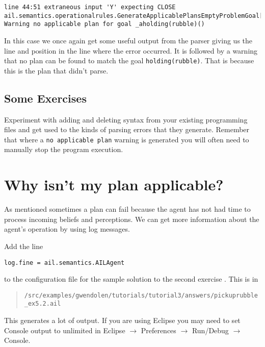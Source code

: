 \begin{verbatim}
line 44:51 extraneous input 'Y' expecting CLOSE
ail.semantics.operationalrules.GenerateApplicablePlansEmptyProblemGoal[WARNING|main|3:19:44]: 
Warning no applicable plan for goal _aholding(rubble)() 
\end{verbatim}

In this case we once again get some useful output from the parser
giving us the line and position in the line where the error occurred.
It is followed by a warning that no plan can be found to match the
goal \texttt{holding(rubble)}.  That is because this is the plan that
didn't parse. 

\subsection{Some
  Exercises} 
Experiment with adding and deleting syntax from your existing
programming files and get used to the kinds of parsing errors that
they generate.  Remember that where a \texttt{no applicable plan}
warning is generated you will often need to manually stop the program
execution. 

\section{Why isn't my plan applicable?}

As mentioned 
sometimes a plan can fail because the agent has not had time to
process incoming beliefs and perceptions.  We can get more information
about the agent's operation by using log
messages. 

Add the line
\begin{verbatim}
log.fine = ail.semantics.AILAgent
\end{verbatim}
to the configuration file for the sample solution to the second exercise .  This is in
\begin{quote}
\texttt{/src/examples/gwendolen/tutorials/tutorial3/answers/pickuprubble\_ex5.2.ail}
\end{quote}
This generates a lot of output.  If you are using Eclipse you may need
to set Console output to unlimited in Eclipse $\rightarrow$
Preferences $\rightarrow$ Run/Debug $\rightarrow$
Console. 

